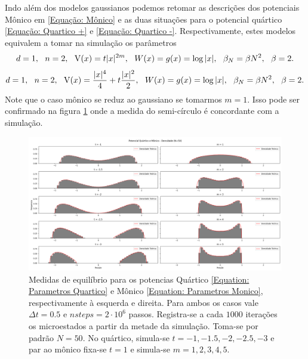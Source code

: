 Indo além dos modelos gaussianos podemos retomar as descrições dos potenciais Mônico em \ref{Equação: Mônico} e as duas situações para o potencial quártico \ref{Equação: Quartico +} e \ref{Equação: Quartico -}. Respectivamente, estes modelos equivalem a tomar na simulação os parâmetros
\begin{equation}
	d = 1, \ \  n = 2, \ \ \V(x)= t |x|^{2m}, \ \ W(x) = g(x) = \log{|x|}, \ \ \beta_N = \beta N^2, \ \ \beta = 2.
	\label{Equation: Parametros Monico}
\end{equation}
\begin{equation}
	d = 1, \ \  n = 2, \ \ \V(x)=\frac{|x|^4}{4} + t \frac{|x|^2}{2}, \ \ W(x) = g(x) = \log{|x|}, \ \ \beta_N = \beta N^2, \ \ \beta = 2.
	\label{Equation: Parametros Quartico}
\end{equation}
Note que o caso mônico se reduz ao gaussiano se tomarmos $m=1$. Isso pode ser confirmado na figura \ref{Figura: Quartic Monic} onde a medida do semi-círculo é concordante com a simulação.
\begin{figure}[ht]
	\includegraphics[width=\textwidth]{Assets/validationQuarticMonic.png}
	\caption{Medidas de equilíbrio para os potencias Quártico \ref{Equation: Parametros Quartico} e Mônico \ref{Equation: Parametros Monico}, respectivamente à esquerda e direita. Para ambos os casos vale $\Delta t = 0.5$ e $nsteps = 2\cdot10^6$ passos. Registra-se a cada $1000$ iterações os microestados a partir da metade da simulação. Toma-se por padrão $N=50$. No quártico, simula-se $t=-1,-1.5,-2,-2.5,-3$ e par ao mônico fixa-se $t=1$ e simula-se $m=1,2,3,4,5$.}
	\label{Figura: Quartic Monic}
\end{figure}
